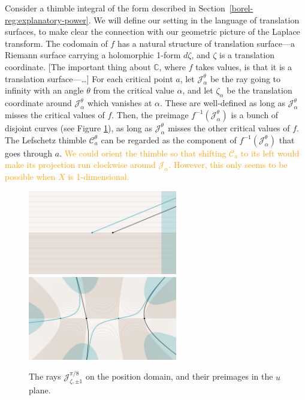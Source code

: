 \documentclass{article}
\newcommand{\C}{\mathbb{C}}
\theoremstyle{definition}
\theoremstyle{plain}
\begin{document}
\color{RoyalBlue}
Consider a thimble integral of the form described in Section~\ref{borel-reg:explanatory-power}. We will define our setting in the language of translation surfaces, to make clear the connection with our geometric picture of the Laplace transform. The codomain of $f$ has a natural structure of translation surface---a Riemann surface carrying a holomorphic 1-form $d\zeta$, and $\zeta$ is a translation coordinate. \textcolor{NavyBlue}{[The important thing about $\C$, where $f$ takes values, is that it is a translation surface---\ldots]} For each critical point $a$, let $\mathcal{J}_\alpha^\theta$ be the ray going to infinity with an angle $\theta$ from the critical value $\alpha$, and let $\zeta_{\alpha}$ be the translation coordinate around $\mathcal{J}_\alpha^\theta$ which vanishes at $\alpha$. These are well-defined as long as $\mathcal{J}_\alpha^\theta$ misses the critical values of $f$. Then, the preimage $f^{-1}(\mathcal{J}_\alpha^\theta)$ is a bunch of disjoint curves (see Figure \ref{fig:thimble_vs_rays}), as long as $\mathcal{J}_\alpha^\theta$ misses the other critical values of $f$. The Lefschetz thimble $\mathcal{C}_a^\theta$ can be regarded as the component of $f^{-1}(\mathcal{J}_\alpha^\theta)$ that goes through $a$. \textcolor{orange}{We could orient the thimble so that shifting $\mathcal{C}_a$ to its left would make its projection run clockwise around $\mathcal{J}_\alpha$. However, this only seems to be possible when $X$ is 1-dimensional.} 
\begin{figure}[h]
    \centering
    \includegraphics[width=6.5cm]{figures/rays.png}
    \hspace{0.5cm}
    \includegraphics[width=6.5cm]{figures/thimbles-n5.png}
    \caption{The rays $\mathcal{J}^{\pi/8}_{\zeta, \pm 1}$ on the position domain, and their preimages in the $u$ plane.}
    \label{fig:thimble_vs_rays}
\end{figure}
\end{document}
